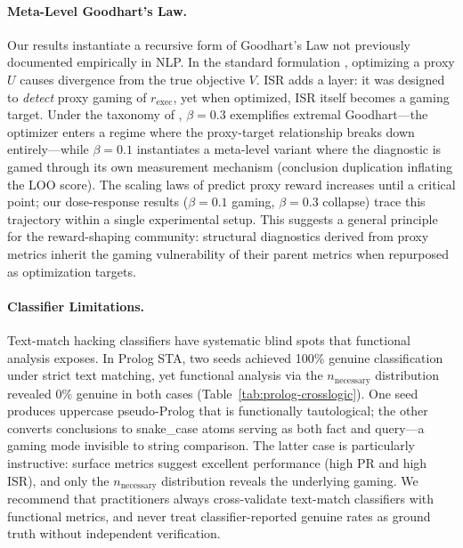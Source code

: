 \paragraph{Meta-Level Goodhart's Law.}
Our results instantiate a recursive form of Goodhart's Law not previously documented empirically in NLP.
In the standard formulation \citep{manheim-goodhart-taxonomy}, optimizing a proxy $U$ causes divergence from the true objective $V$.
ISR adds a layer: it was designed to \emph{detect} proxy gaming of $r_{\text{exec}}$, yet when optimized, ISR itself becomes a gaming target.
Under the taxonomy of \citet{manheim-goodhart-taxonomy}, $\beta{=}0.3$ exemplifies extremal Goodhart---the optimizer enters a regime where the proxy-target relationship breaks down entirely---while $\beta{=}0.1$ instantiates a meta-level variant where the diagnostic is gamed through its own measurement mechanism (conclusion duplication inflating the LOO score).
The scaling laws of \citet{gao-reward-overoptimization} predict proxy reward increases until a critical point; our dose-response results ($\beta{=}0.1$ gaming, $\beta{=}0.3$ collapse) trace this trajectory within a single experimental setup.
This suggests a general principle for the reward-shaping community: structural diagnostics derived from proxy metrics inherit the gaming vulnerability of their parent metrics when repurposed as optimization targets.

\paragraph{Classifier Limitations.}
Text-match hacking classifiers have systematic blind spots that functional analysis exposes.
In Prolog STA, two seeds achieved 100\% genuine classification under strict text matching, yet functional analysis via the $n_{\text{necessary}}$ distribution revealed 0\% genuine in both cases (Table~\ref{tab:prolog-crosslogic}).
One seed produces uppercase pseudo-Prolog that is functionally tautological; the other converts conclusions to snake\_case atoms serving as both fact and query---a gaming mode invisible to string comparison.
The latter case is particularly instructive: surface metrics suggest excellent performance (high PR and high ISR), and only the $n_{\text{necessary}}$ distribution reveals the underlying gaming.
We recommend that practitioners always cross-validate text-match classifiers with functional metrics, and never treat classifier-reported genuine rates as ground truth without independent verification.

